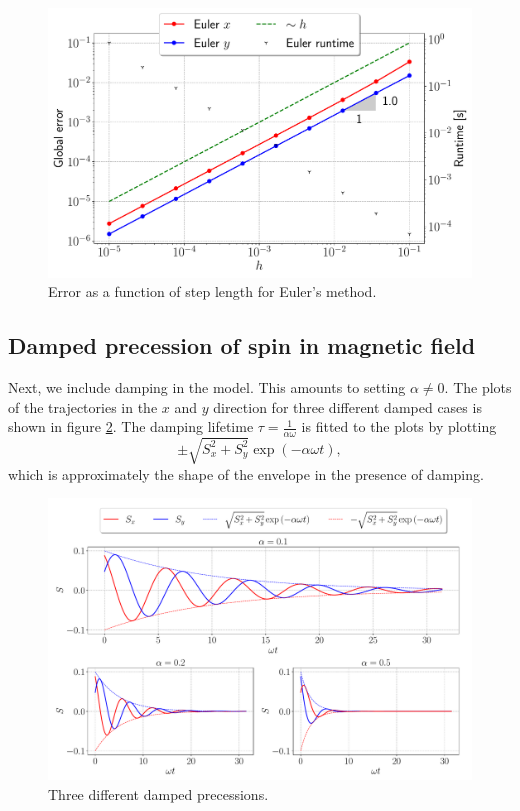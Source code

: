 \begin{figure}[htb]
	\centering
	\includegraphics[width =0.8\columnwidth]{../fig/err_euler.pdf}
	\caption{Error as a function of step length for Euler's method.}
	\label{fig:err_euler}
\end{figure}

\subsection{Damped precession of spin in magnetic field}

Next, we include damping in the model. This amounts to setting $\alpha \neq 0$. The plots of the trajectories in the $x$ and $y$ direction for three different damped cases is shown in figure \ref{fig:damped}. The damping lifetime $\tau =  \frac{1}{\alpha \omega}$ is fitted to the plots by plotting 
\[
	\pm \sqrt{S_x^2 + S_y^2} \exp{\left(-\alpha \omega t\right)},
\]
which is approximately the shape of the envelope in the presence of damping.  


\begin{figure}[htb]
	\centering
	\includegraphics[width=\columnwidth]{../fig/damped_precession.pdf}
	\caption{Three different damped precessions.}
	\label{fig:damped}
\end{figure}